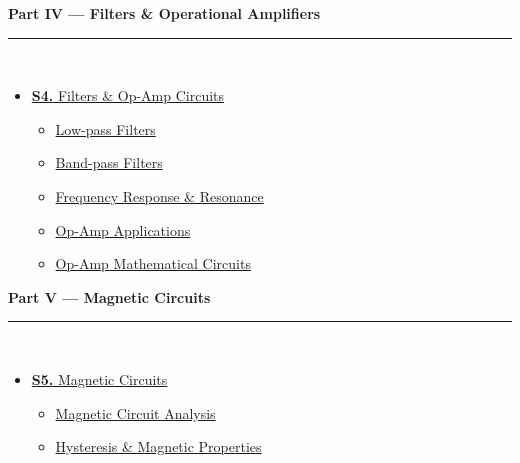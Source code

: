 \documentclass[12pt,a3paper]{article}
\begin{document}
\vspace{6pt}

\begin{tcolorbox}[breakable,colback=cE!5,colframe=cE,boxrule=1pt,arc=5pt,
  left=8pt,right=8pt,top=8pt,bottom=8pt,before skip=4pt]
  {\large\bfseries\textcolor{cE}{Part IV --- Filters \& Operational Amplifiers}}\\[5pt]
  \textcolor{cE!40}{\rule{\textwidth}{0.4pt}}\\[3pt]
  \small\begin{itemize}[leftmargin=1.2em,itemsep=1pt,label={\textcolor{cE}{$\triangleright$}}]
    \item \hyperref[sec:S4]{\textbf{S4.} Filters \& Op-Amp Circuits}
      \begin{itemize}[leftmargin=1.5em,itemsep=0pt,label={\textcolor{cE}{$\cdot$}}]
        \item \hyperref[sub:s4-lowpass]{Low-pass Filters}
        \item \hyperref[sub:s4-filters]{Band-pass Filters}
        \item \hyperref[sub:s4-resonance]{Frequency Response \& Resonance}
        \item \hyperref[sub:s4-opamp]{Op-Amp Applications}
        \item \hyperref[sub:s4-math]{Op-Amp Mathematical Circuits}
      \end{itemize}
  \end{itemize}
\end{tcolorbox}

\vspace{6pt}

\begin{tcolorbox}[breakable,colback=cD!5,colframe=cD,boxrule=1pt,arc=5pt,
  left=8pt,right=8pt,top=8pt,bottom=8pt,before skip=4pt]
  {\large\bfseries\textcolor{cD}{Part V --- Magnetic Circuits}}\\[5pt]
  \textcolor{cD!40}{\rule{\textwidth}{0.4pt}}\\[3pt]
  \small\begin{itemize}[leftmargin=1.2em,itemsep=1pt,label={\textcolor{cD}{$\triangleright$}}]
    \item \hyperref[sec:S5]{\textbf{S5.} Magnetic Circuits}
      \begin{itemize}[leftmargin=1.5em,itemsep=0pt,label={\textcolor{cD}{$\cdot$}}]
        \item \hyperref[sub:s5-magnetic]{Magnetic Circuit Analysis}
        \item \hyperref[sub:s5-hysteresis]{Hysteresis \& Magnetic Properties}
      \end{itemize}
  \end{itemize}
\end{tcolorbox}
\end{document}
